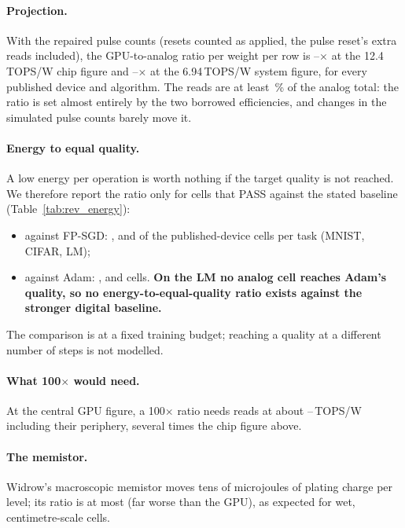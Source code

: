 \paragraph{Projection.} With the repaired pulse counts (resets counted as applied, the pulse reset's extra reads included), the
GPU-to-analog ratio per weight per row is \RVenChipMin--\RVenChipMax$\times$ at the 12.4\,TOPS/W chip figure and
\RVenSysMin--\RVenSysMax$\times$ at the 6.94\,TOPS/W system figure, for every published device and algorithm. The reads are at
least \RVenChipMvmShareMin\,\% of the analog total: the ratio is set almost entirely by the two borrowed efficiencies, and
changes in the simulated pulse counts barely move it.

\paragraph{Energy to equal quality.} A low energy per operation is worth nothing if the target quality is not reached. We
therefore report the ratio only for cells that PASS against the stated baseline (Table~\ref{tab:rev_energy}):
\begin{itemize}
\item against FP-SGD: \RVenEqFpMnistN, \RVenEqFpCifarN{} and \RVenEqFpLmN{} of the \RVenCellsMnistN{} published-device cells per
      task (MNIST, CIFAR, LM);
\item against Adam: \RVenEqAdamMnistN, \RVenEqAdamCifarN{} and \RVenEqAdamLmN{} cells. \textbf{On the LM no analog cell reaches
      Adam's quality, so no energy-to-equal-quality ratio exists against the stronger digital baseline.}
\end{itemize}
The comparison is at a fixed training budget; reaching a quality at a different number of steps is not modelled.

\paragraph{What 100$\times$ would need.} At the central GPU figure, a 100$\times$ ratio needs reads at about
\RVenNeedTopsMin--\RVenNeedTopsMax\,TOPS/W including their periphery, several times the chip figure above.

\paragraph{The memistor.} Widrow's macroscopic memistor moves tens of microjoules of plating charge per level; its ratio is at
most \RVenWidrowRatioMax{} (far worse than the GPU), as expected for wet, centimetre-scale cells.


